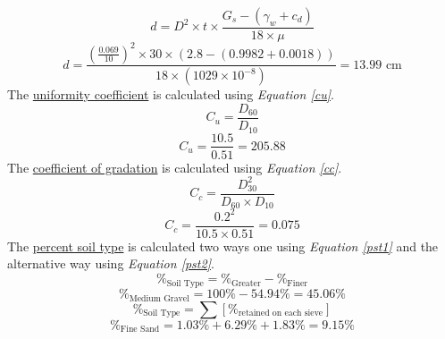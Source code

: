 \documentclass{article}
\begin{document}
\begin{equation}\label{dist}d=D^2\times t\times \frac{G_s-(\gamma_w+c_d)}{18\times \mu}\end{equation}
\[d=\frac{\left(\frac{0.069}{10}\right)^2\times 30\times (2.8-(0.9982+0.0018))}{18\times(1029\times 10^{-8})}=\boxed{13.99\text{ cm}}\]
\noindent The \underline{uniformity coefficient} is calculated using \emph{Equation \ref{cu}}. 
\begin{equation}\label{cu}C_u=\frac{D_{60}}{D_{10}}\end{equation} 
\[C_u=\frac{10.5}{0.51}=\boxed{205.88}\]
\noindent The \underline{coefficient of gradation} is calculated using \emph{Equation \ref{cc}}. 
\begin{equation}\label{cc}C_c=\frac{D_{30}^2}{D_{60}\times D_{10}}\end{equation} 
\[C_c=\frac{0.2^2}{10.5\times 0.51}=\boxed{0.075}\] 
\noindent The \underline {percent soil type} is calculated two ways one using \emph{Equation \ref{pst1}} and the alternative way using \emph{Equation \ref{pst2}}. 
\begin{equation}\label{pst1}\%_\text{Soil Type}=\%_\text{Greater}-\%_\text{Finer}\end{equation}
\[\%_\text{Medium Gravel}=100\%-54.94\%=\boxed{45.06\%}\] 
\begin{equation}\label{pst2}\%_\text{Soil Type}=\sum[\%_\text{retained on each sieve}]\end{equation}
\[\%_\text{Fine Sand}=1.03\%+6.29\%+1.83\%=\boxed{9.15\%}\]
\end{document}
